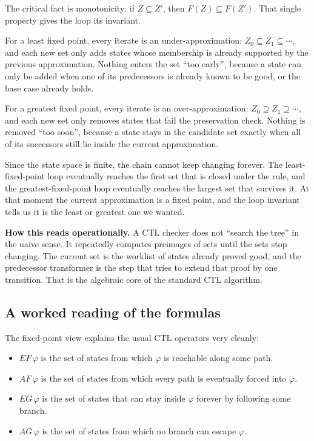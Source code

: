 \begin{formaldetails}
The critical fact is monotonicity: if $Z \subseteq Z'$, then $F(Z) \subseteq
F(Z')$.  That single property gives the loop its invariant.

For a least fixed point, every iterate is an under-approximation:
$Z_0 \subseteq Z_1 \subseteq \cdots$, and each new set only adds states whose
membership is already supported by the previous approximation.  Nothing enters
the set ``too early'', because a state can only be added when one of its
predecessors is already known to be good, or the base case already holds.

For a greatest fixed point, every iterate is an over-approximation:
$Z_0 \supseteq Z_1 \supseteq \cdots$, and each new set only removes states
that fail the preservation check.  Nothing is removed ``too soon'', because a
state stays in the candidate set exactly when all of its successors still lie
inside the current approximation.

Since the state space is finite, the chain cannot keep changing forever.  The
least-fixed-point loop eventually reaches the first set that is closed under
the rule, and the greatest-fixed-point loop eventually reaches the largest set
that survives it.  At that moment the current approximation is a fixed point,
and the loop invariant tells us it is the least or greatest one we wanted.
\end{formaldetails}

\medskip\noindent
\textbf{How this reads operationally.}  A CTL checker does not ``search the
tree'' in the naive sense.  It repeatedly computes preimages of sets until the
sets stop changing.  The current set is the worklist of states already proved
good, and the predecessor transformer is the step that tries to extend that
proof by one transition.  That is the algebraic core of the standard CTL
algorithm.

\subsection{A worked reading of the formulas}

The fixed-point view explains the usual CTL operators very cleanly:
\begin{itemize}
  \item $EF\,\varphi$ is the set of states from which $\varphi$ is reachable
        along some path.
  \item $AF\,\varphi$ is the set of states from which every path is
        eventually forced into $\varphi$.
  \item $EG\,\varphi$ is the set of states that can stay inside $\varphi$
        forever by following some branch.
  \item $AG\,\varphi$ is the set of states from which no branch can escape
        $\varphi$.
\end{itemize}

